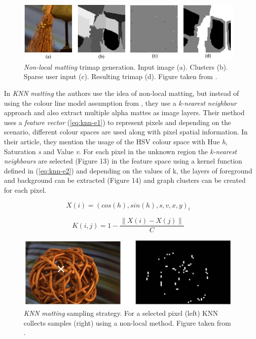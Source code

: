 \begin{figure}[t!]
\centering
\includegraphics[width=1\columnwidth]{Chapter2/2/nonlocal_figure_1.jpg}
\caption[Non-local matting trimap generation.]{\textit{Non-local matting} trimap generation. Input image (a). Clusters (b). Sparse user input (c). Resulting trimap (d). Figure taken from \cite{nonlocal}.}
\label{fig:nonlocal-1}
\end{figure}

In \textit{KNN matting} \cite{knn} the authors use the idea of non-local matting, but instead of using the colour line model assumption from \cite{closedform}, they use a \textit{k-nearest neighbour} approach and also extract multiple alpha mattes as image layers. Their method uses a \textit{feature vector} (\ref{eq:knn-e1}) to represent pixels and depending on the scenario, different colour spaces are used along with pixel spatial information. In their article, they mention the usage of the HSV colour space with Hue \textit{h}, Saturation \textit{s} and Value \textit{v}. For each pixel in the unknown region the \textit{k-nearest neighbours} are selected (Figure 13) in the feature space using a kernel function defined in (\ref{eq:knn-e2}) and depending on the values of k, the layers of foreground and background can be extracted (Figure 14) and graph clusters can be created for each pixel.

\begin{equation} \label{eq:knn-e1}
X(i)=(cos(h),sin(h),s,v,x,y)_{i}
\end{equation}

\begin{equation} \label{eq:knn-e2}
K(i,j)=1-\frac{\left \| X(i)-X(j) \right \|}{C}
\end{equation}

\begin{figure}[t!]
\centering
\includegraphics[width=1\columnwidth]{Chapter2/2/knn_figure_1.jpg}
\caption[KNN sampling strategy.]{\textit{KNN matting} sampling strategy. For a selected pixel (left) KNN collects samples (right) using a non-local method. Figure taken from \cite{knn}.}
\label{fig:knn-f1}
\end{figure}


